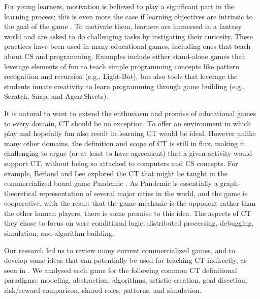 \documentclass{acm_proc_article-sp}
\begin{document}
For young learners, motivation is believed to play a significant part in the learning process; this is even more the case if learning objectives are intrinsic to the goal of the game \cite{malone1987making}.
To motivate them, learners are immersed in a fantasy world and are asked to do challenging tasks by instigating their curiosity.
These practices have been used in many educational games, including ones that teach about CS and programming.
Examples include either stand-alone games that leverage elements of fun to teach simple programming concepts like pattern recognition and recursion (e.g., Light-Bot), but also tools that leverage the students innate creativity to learn programming through game building (e.g., Scratch, Snap, and AgentSheets).

It is natural to want to extend the enthusiasm and promise of educational games to every domain, CT should be no exception.
To offer an environment in which play and hopefully fun also result in learning CT would be ideal.
However unlike many other domains, the definition and scope of CT is still in flux, making it challenging to argue (or at least to have agreement) that a given activity would support CT, without being so attached to computers and CS concepts.
For example, Berland and Lee explored the CT that might be taught in the commercialized board game Pandemic \cite{berland2011collaborative}.
As Pandemic is essentially a graph-theoretical representation of several major cities in the world, and the game is cooperative, with the result that the game mechanic is the opponent rather than the other human players, there is some promise to this idea.
The aspects of CT they chose to focus on were conditional logic, distributed processing, debugging, simulation, and algorithm building. 

Our research led us to review many current commercialized games, and to develop some ideas that can potentially be used for teaching CT indirectly, as seen in {\em \hyperref[table:games-comparison]{}}.
We analysed each game for the following common CT definitional paradigms: modeling, abstraction, algorithms, artistic creation, goal disection, risk/reward comparison, shared roles, patterns, and simulation.
\end{document}
